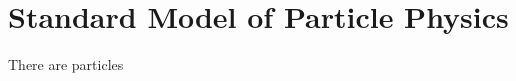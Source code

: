 \section{Standard Model of Particle Physics}
\label{sec:particles}
There are particles~\cite{pdg2010}